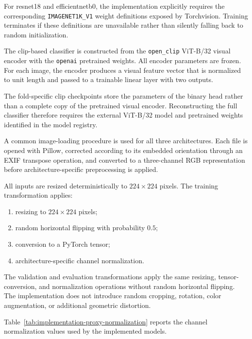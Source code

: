 For \gls{resnet18} and \gls{efficientnetb0}, the implementation explicitly requires the
corresponding \texttt{IMAGENET1K\_V1} weight definitions exposed by
Torchvision. Training terminates if these definitions are unavailable rather
than silently falling back to random initialization.

The \gls{clip}-based classifier is constructed from the
\texttt{open\_clip} ViT-B/32 visual encoder with the
\texttt{openai} pretrained weights. All encoder parameters are frozen. For
each image, the encoder produces a visual feature vector that is normalized to
unit length and passed to a trainable linear layer with two outputs.

The fold-specific \gls{clip} checkpoints store the parameters of the binary
head rather than a complete copy of the pretrained visual encoder.
Reconstructing the full classifier therefore requires the external ViT-B/32 model
and pretrained weights identified in the model registry.

A common image-loading procedure is used for all three architectures. Each file
is opened with Pillow, corrected according to its embedded orientation through
an EXIF transpose operation, and converted to a three-channel RGB
representation before architecture-specific preprocessing is applied.

All inputs are resized deterministically to \(224 \times 224\) pixels. The
training transformation applies:

\begin{enumerate}
\item resizing to \(224 \times 224\) pixels;
\item random horizontal flipping with probability \(0.5\);
\item conversion to a PyTorch tensor;
\item architecture-specific channel normalization.
\end{enumerate}

The validation and evaluation transformations apply the same resizing,
tensor-conversion, and normalization operations without random horizontal
flipping. The implementation does not introduce random cropping, rotation,
color augmentation, or additional geometric distortion.

Table~\ref{tab:implementation-proxy-normalization} reports the channel
normalization values used by the implemented models.

